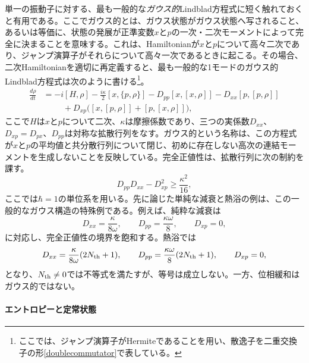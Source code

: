 \documentclass[a4paper,11pt,oneside]{article}
\theoremstyle{definition}
\numberwithin{equation}{section}
\begin{document}
単一の振動子に対する、最も一般的な\textit{ガウス的}Lindblad方程式に短く触れておくと有用である。ここでガウス的とは、ガウス状態がガウス状態へ写されること、あるいは等価に、状態の発展が正準変数\(x\)と\(p\)の一次・二次モーメントによって完全に決まることを意味する。これは、Hamiltonianが\(x\)と\(p\)について高々二次であり、ジャンプ演算子がそれらについて高々一次であるときに起こる。その場合、二次Hamiltonianを適切に再定義すると、最も一般的な1モードのガウス的Lindblad方程式は次のように書ける\footnote{ここでは、ジャンプ演算子がHermiteであることを用い、散逸子を二重交換子の形\eqref{doublecommutator}で表している。}。
\begin{align}\label{generalLindbladian}
\frac{d\rho}{dt}
&=
-i[H,\rho]
-\frac{i\kappa}{2}[x,\{p,\rho\}]
-D_{pp}[x,[x,\rho]]
-D_{xx}[p,[p,\rho]]
\nonumber\\
&\hspace{1cm}
+D_{xp}\bigl([x,[p,\rho]]+[p,[x,\rho]]\bigr) ,
\end{align}
ここで\(H\)は\(x\)と\(p\)について二次、\(\kappa\)は摩擦係数であり、三つの実係数\(D_{xx}\)、\(D_{xp}=D_{px}\)、\(D_{pp}\)は対称な拡散行列をなす。ガウス的という名称は、この方程式が\(x\)と\(p\)の平均値と共分散行列について閉じ、初めに存在しない高次の連結モーメントを生成しないことを反映している。完全正値性は、拡散行列に次の制約を課す。
\begin{equation}
D_{pp}D_{xx}-D_{xp}^{2}\geq \frac{\kappa^{2}}{16} ,
\end{equation}
ここでは\(\hbar=1\)の単位系を用いる。先に論じた単純な減衰と熱浴の例は、この一般的なガウス構造の特殊例である。例えば、純粋な減衰は
\begin{equation}
D_{xx}=\frac{\kappa}{8\omega},
\qquad
D_{pp}=\frac{\kappa\omega}{8},
\qquad
D_{xp}=0 ,
\end{equation}
に対応し、完全正値性の境界を飽和する。熱浴では
\begin{equation}
D_{xx}=\frac{\kappa}{8\omega}(2N_{\rm th}+1),
\qquad
D_{pp}=\frac{\kappa\omega}{8}(2N_{\rm th}+1),
\qquad
D_{xp}=0 ,
\end{equation}
となり、$  N_{\rm th} \neq 0 $では不等式を満たすが、等号は成立しない。一方、位相緩和はガウス的ではない。





\paragraph{エントロピーと定常状態}
\end{document}
